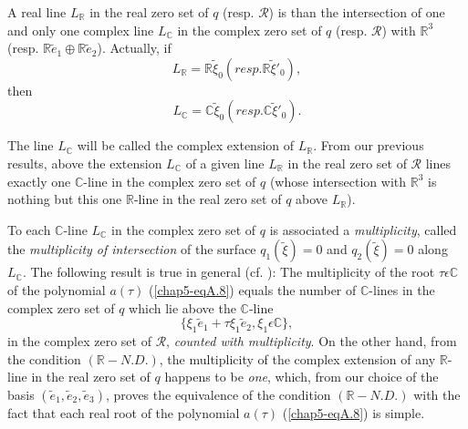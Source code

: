 A real line $L_{\mathbb{R}}$ in the real zero set of $q$ (resp. $\mathscr{R}$) is than the intersection of one and only one complex line $L_{\mathbb{C}}$ in  the complex zero set of $q$ (resp. $\mathscr{R}$) with $\mathbb{R}^{3}$ (resp. $\mathbb{R} \widetilde{e}_{1} \oplus \mathbb{R} \widetilde{e}_{2}$). Actually, if
$$
L_{\mathbb{R}} = \mathbb{R} \widetilde{\xi}_{0} (resp. \mathbb{R} \widetilde{\xi}'_{0}),
$$
then\pageoriginale
$$
L_{\mathbb{C}} = \mathbb{C} \widetilde{\xi}_{0} (resp. \mathbb{C} \widetilde{\xi}'_{0}).
$$

The line $L_{\mathbb{C}}$ will be called the complex extension of $L_{\mathbb{R}}$. From our previous results, above the extension $L_{\mathbb{C}}$ of a given line $L_{\mathbb{R}}$ in  the real zero set of $\mathscr{R}$ lines exactly one $\mathbb{C}$-line in the complex zero set of $q$ (whose intersection with $\mathbb{R}^{3}$ is nothing but this one $\mathbb{R}$-line in the real zero set of $q$ above $L_{\mathbb{R}}$).

To each $\mathbb{C}$-line $L_{\mathbb{C}}$ in the complex zero set of $q$ is associated a {\em multiplicity}, called the {\em multiplicity of intersection} of the surface $q_{1}(\widetilde{\xi}) = 0$ and $q_{2}(\widetilde{\xi}) = 0$ along $L_{\mathbb{C}}$. The following result is true in general (cf. \cite{11}): The multiplicity of the root $\tau \epsilon \mathbb{C}$ of the polynomial $a(\tau)$ (\ref{chap5-eqA.8}) equals the number of $\mathbb{C}$-lines in the complex zero set of $q$ which lie above the $\mathbb{C}$-line
$$
\{\xi_{1} \widetilde{e}_{1} + \tau \xi_{1} \widetilde{e}_{2}, \xi_{1} \epsilon \mathbb{C}\},
$$
in the complex zero set of $\mathscr{R}$, {\em counted with multiplicity}. On the other hand, from the condition $(\mathbb{R}-N.D.)$, the multiplicity of the complex extension of any $\mathbb{R}$-line in the real zero set of $q$ happens to be {\em one}, which, from our choice of the basis $(\widetilde{e}_{1}, \widetilde{e}_{2}, \widetilde{e}_{3})$, proves the equivalence of the condition $(\mathbb{R}-N.D.)$ with the fact that each real root of the polynomial $a(\tau)$ (\ref{chap5-eqA.8}) is simple.

